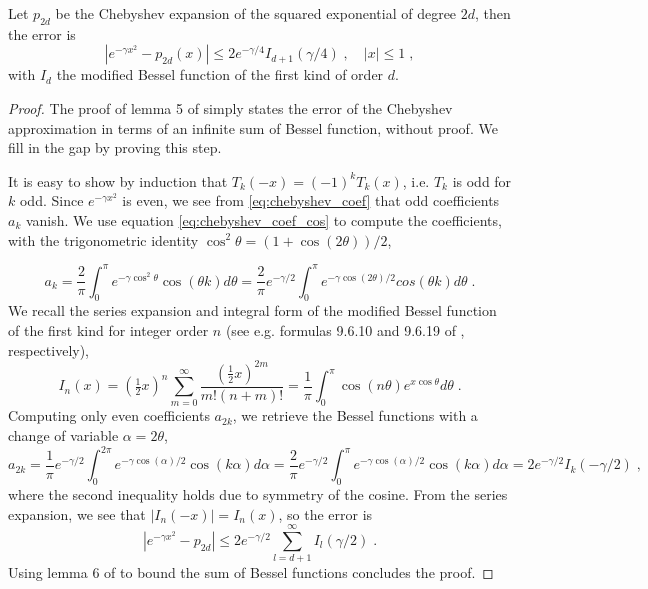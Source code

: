 \documentclass{article}
\begin{document}
\begin{lemma} \label{thm:se_decay_1d}
Let $p_{2d}$ be the Chebyshev expansion of the squared exponential of degree $2d$, then the error is
\begin{equation*}
    | e^{-\gamma x^2} - p_{2d}(x)| \le 2 e^{-\gamma / 4} I_{d+1}(\gamma / 4) \;, \quad |x| \le 1 \;, 
\end{equation*}
%
with $I_d$ the modified Bessel function of the first kind of order $d$.
\end{lemma}
\begin{proof}
The proof of lemma 5 of \cite{gardner_gpytorch_2021} simply states the error of the Chebyshev approximation in terms of an infinite sum of Bessel function, without proof. We fill in the gap by proving this step. 

It is easy to show by induction that $T_k(-x) = (-1)^k T_k(x)$, i.e. $T_k$ is odd for $k$ odd. Since $e^{-\gamma x^2}$ is even, we see from \eqref{eq:chebyshev_coef} that odd coefficients $a_k$ vanish. We use equation \eqref{eq:chebyshev_coef_cos} to compute the coefficients, with the trigonometric identity $\cos^2\theta = (1 + \cos(2\theta))/2$,

\begin{equation*}
    a_k = \frac{2}{\pi} \int_0^\pi e^{-\gamma \cos^2 \theta} \cos(\theta k) d\theta = \frac{2}{\pi} e^{-\gamma / 2} \int_0^\pi e^{-\gamma \cos(2\theta) / 2} cos(\theta k) d\theta \; .
\end{equation*}
%
We recall the series expansion and integral form of the modified Bessel function of the first kind for integer order $n$ (see e.g. formulas 9.6.10 and 9.6.19 of \cite{abramowitz_handbook_1972}, respectively),
\begin{equation*}
    I_n(x) = (\tfrac{1}{2}x)^n \sum_{m=0}^\infty \frac{(\frac{1}{2} x)^{2m}}{m! (n+m)!} = \frac{1}{\pi} \int_0^\pi \cos(n\theta) e^{x\cos\theta} d\theta \; .
\end{equation*}
%
Computing only even coefficients $a_{2k}$, we retrieve the Bessel functions with a change of variable $\alpha=2\theta$,
\begin{equation*}
    a_{2k} = \frac{1}{\pi} e^{-\gamma /2} \int_0^{2\pi} e^{-\gamma \cos( \alpha)/2} \cos(k\alpha) d\alpha 
    = \frac{2}{\pi} e^{-\gamma /2} \int_0^{\pi} e^{-\gamma \cos( \alpha)/2} \cos(k\alpha) d\alpha = 2 e^{-\gamma/2} I_{k}(-\gamma/2) \; ,
\end{equation*}
%
where the second inequality holds due to symmetry of the cosine. From the series expansion, we see that $|I_n(-x)| = I_n(x)$, so the error is 
\begin{equation*}
    |e^{-\gamma x^2 } - p_{2d} |\le 2 e^{-\gamma/2} \sum_{l=d+1}^\infty I_{l}(\gamma / 2) \; .
\end{equation*}
%
Using lemma 6 of \cite{gardner_gpytorch_2021} to bound the sum of Bessel functions concludes the proof. 
\end{proof}
\end{document}
